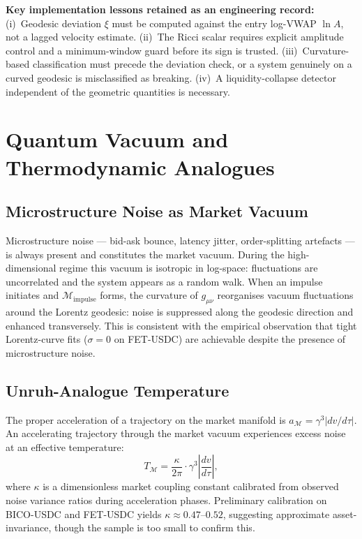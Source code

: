 \documentclass[12pt,a4paper]{article}
\begin{document}
\textbf{Key implementation lessons retained as an engineering record:}
(i)~Geodesic deviation $\xi$ must be computed against the entry log-VWAP
$\ln A$, not a lagged velocity estimate. (ii)~The Ricci scalar requires
explicit amplitude control and a minimum-window guard before its sign is
trusted. (iii)~Curvature-based classification must precede the deviation
check, or a system genuinely on a curved geodesic is misclassified as
breaking. (iv)~A liquidity-collapse detector independent of the geometric
quantities is necessary.


\section{Quantum Vacuum and Thermodynamic Analogues}

\subsection{Microstructure Noise as Market Vacuum}

Microstructure noise --- bid-ask bounce, latency jitter, order-splitting
artefacts --- is always present and constitutes the market vacuum. During
the high-dimensional regime this vacuum is isotropic in log-space:
fluctuations are uncorrelated and the system appears as a random walk.
When an impulse initiates and $\mathcal{M}_{\text{impulse}}$ forms, the
curvature of $g_{\mu\nu}$ reorganises vacuum fluctuations around the
Lorentz geodesic: noise is suppressed along the geodesic direction and
enhanced transversely. This is consistent with the empirical observation
that tight Lorentz-curve fits ($\sigma=0$ on FET-USDC) are achievable
despite the presence of microstructure noise.

\subsection{Unruh-Analogue Temperature}

The proper acceleration of a trajectory on the market manifold is
$a_\mathcal{M} = \gamma^3|dv/d\tau|$. An accelerating trajectory through
the market vacuum experiences excess noise at an effective temperature:
\begin{equation}
    T_\mathcal{M} = \frac{\kappa}{2\pi}\cdot\gamma^3\left|\frac{dv}{d\tau}\right|,
\end{equation}
where $\kappa$ is a dimensionless market coupling constant calibrated from
observed noise variance ratios during acceleration phases. Preliminary
calibration on BICO-USDC and FET-USDC yields $\kappa\approx0.47$--$0.52$,
suggesting approximate asset-invariance, though the sample is too small to
confirm this.
\end{document}
